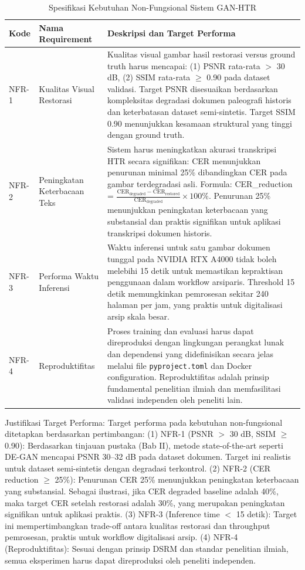 \documentclass[12pt,a4paper]{article}
\begin{document}
\begin{table}[htbp!]
\centering
\small
\caption{Spesifikasi Kebutuhan Non-Fungsional Sistem GAN-HTR}
\label{tab:non_functional_requirements}
\begin{tabular}{p{}p{}p{}}
\toprule
\textbf{Kode} & \textbf{Nama Requirement} & \textbf{Deskripsi dan Target Performa} \\
\midrule
NFR-1 & Kualitas Visual Restorasi & Kualitas visual gambar hasil restorasi versus ground truth harus mencapai: (1) PSNR rata-rata $>$ 30 dB, (2) SSIM rata-rata $\geq$ 0.90 pada dataset validasi. Target PSNR disesuaikan berdasarkan kompleksitas degradasi dokumen paleografi historis dan keterbatasan dataset semi-sintetis. Target SSIM 0.90 menunjukkan kesamaan struktural yang tinggi dengan ground truth. \\
\midrule
NFR-2 & Peningkatan Keterbacaan Teks & Sistem harus meningkatkan akurasi transkripsi HTR secara signifikan: CER menunjukkan penurunan minimal 25\% dibandingkan CER pada gambar terdegradasi asli. Formula: CER\_reduction = $\frac{\text{CER}_{\text{degraded}} - \text{CER}_{\text{restored}}}{\text{CER}_{\text{degraded}}} \times 100\%$. Penurunan 25\% menunjukkan peningkatan keterbacaan yang substansial dan praktis signifikan untuk aplikasi transkripsi dokumen historis. \\
\midrule
NFR-3 & Performa Waktu Inferensi & Waktu inferensi untuk satu gambar dokumen tunggal pada NVIDIA RTX A4000 tidak boleh melebihi 15 detik untuk memastikan kepraktisan penggunaan dalam workflow arsiparis. Threshold 15 detik memungkinkan pemrosesan sekitar 240 halaman per jam, yang praktis untuk digitalisasi arsip skala besar. \\
\midrule
NFR-4 & Reproduktifitas & Proses training dan evaluasi harus dapat direproduksi dengan lingkungan perangkat lunak dan dependensi yang didefinisikan secara jelas melalui file \texttt{pyproject.toml} dan Docker configuration. Reproduktifitas adalah prinsip fundamental penelitian ilmiah dan memfasilitasi validasi independen oleh peneliti lain. \\
\bottomrule
\end{tabular}
\end{table}

Justifikasi Target Performa: Target performa pada kebutuhan non-fungsional ditetapkan berdasarkan pertimbangan: (1) NFR-1 (PSNR $>$ 30 dB, SSIM $\geq$ 0.90): Berdasarkan tinjauan pustaka (Bab II), metode state-of-the-art seperti DE-GAN mencapai PSNR 30--32 dB pada dataset dokumen. Target ini realistis untuk dataset semi-sintetis dengan degradasi terkontrol. (2) NFR-2 (CER reduction $\geq$ 25\%): Penurunan CER 25\% menunjukkan peningkatan keterbacaan yang substansial. Sebagai ilustrasi, jika CER degraded baseline adalah 40\%, maka target CER setelah restorasi adalah 30\%, yang merupakan peningkatan signifikan untuk aplikasi praktis. (3) NFR-3 (Inference time $<$ 15 detik): Target ini mempertimbangkan trade-off antara kualitas restorasi dan throughput pemrosesan, praktis untuk workflow digitalisasi arsip. (4) NFR-4 (Reproduktifitas): Sesuai dengan prinsip DSRM dan standar penelitian ilmiah, semua eksperimen harus dapat direproduksi oleh peneliti independen.
\end{document}
